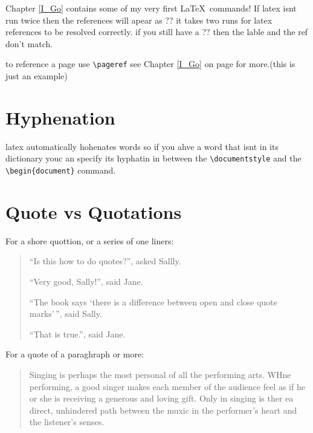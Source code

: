 \documentclass[12pt,twoside,leqno]{article}%
\begin{document}
Chapter \ref{I_Go} contains some of my very first \LaTeX\ commands!
If latex isnt run twice then the references will apear as ?? it takes two runs for latex references to be resolved correctly. if you still have a ?? then the lable and the ref don't match.

to reference a  page use \verb!\pageref!  see Chapter \ref{I_Go} on page \pageref{I_Go} for more.(this is just an example)
\section{Hyphenation}
latex automatically hohenates words so if you ahve a word that isnt in its dictionary youc an specify its hyphatin in between the \verb!\documentstyle! and the 
\verb!\begin{document}! command.

\section{Quote vs Quotations}
For a shore quottion, or a series of one liners:

\begin{quote}
``Is this how to do quotes?'', asked Sallly.

``Very good, Sally!'', said Jane.

``The book says `there is a difference between open and close quote marks'\,'', said Sally.

``That is true.'', said Jane.
\end{quote}

For a quote of a paraghraph or more:

\begin{quotation}
Singing is perhaps the most personal of all the performing arts. WHne performing, a good singer makes each member of the audience feel as if he or she is receiving a generous and loving gift. Only in singing is ther ea direct, unhindered path between the muxic in the performer's heart and the listener's senses. 
\end{quotation}
\end{document}
